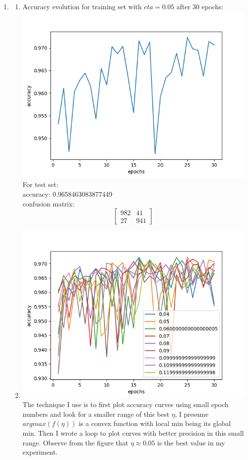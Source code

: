 \documentclass[11pt, oneside]{article}   	%
\begin{document}
\begin{enumerate}
\item %
  \begin{enumerate}
  \item
    Accuracy evolution for training set with $eta=0.05$ after 30 epochs:\\
    \includegraphics[width=15cm]{2_2a.png}
    For test set:\\
    accuracy: 0.9658463083877449\\
    confusion matrix:
    \[
    \left[
      \begin{array}{cc}
	982	&	41\\
	27	&	941
      \end{array}
      \right]
    \]

  \item
    \includegraphics[width=15cm]{005wins.png}
    The technique I use is to first plot accuracy curves using small epoch numbers and look for a smaller range of this best $\eta$, I presume $argmax(f(\eta))$ is a convex function with local min being its global min. Then I wrote a loop to plot curves with better precision in this small range. Observe from the figure that $\eta \approx 0.05$ is the best value in my experiment.


    
  \end{enumerate}
\end{enumerate}
\end{document}
